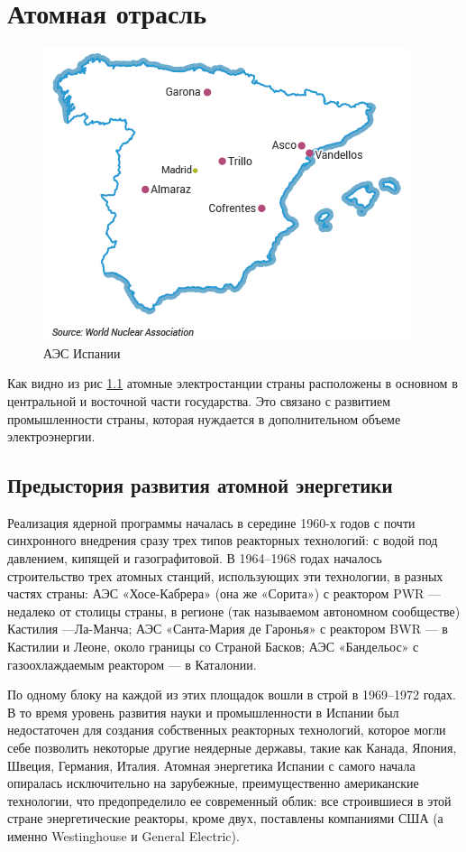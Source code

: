 \chapter{Атомная отрасль}

\begin{figure}[h]
	\begin{center}
		\includegraphics[width=.5\columnwidth]{./img/world_n_a.png}
	\end{center}
	\caption{АЭС Испании}
	\label{pic:mapOfNPP}
\end{figure}

Как видно из рис \ref{pic:mapOfNPP} атомные электростанции страны расположены в основном в центральной и восточной части государства. Это связано с развитием промышленности страны, которая нуждается в дополнительном объеме электроэнергии.

\section{Предыстория развития атомной энергетики}

Реализация ядерной программы началась в середине 1960-х годов с почти синхронного внедрения сразу трех типов реакторных технологий: с водой под давлением, кипящей и газографитовой. В 1964–1968 годах началось строительство трех атомных станций, использующих эти технологии, в разных частях страны: АЭС «Хосе-Кабрера» (она же «Сорита») с реактором PWR — недалеко от столицы страны, в регионе (так называемом автономном сообществе) Кастилия —Ла-Манча; АЭС «Санта-Мария де Гаронья» с реактором BWR — в Кастилии и Леоне, около границы со Страной Басков; АЭС «Бандельос» с газоохлаждаемым реактором — в Каталонии. 

По одному блоку на каждой из этих площадок вошли в строй в 1969–1972 годах. В то время уровень развития науки и промышленности в Испании был недостаточен для создания собственных реакторных технологий, которое могли себе позволить некоторые другие неядерные державы, такие как Канада, Япония, Швеция, Германия, Италия. Атомная энергетика Испании с самого начала опиралась исключительно на зарубежные, преимущественно американские технологии, что предопределило ее современный облик: все строившиеся в этой стране энергетические реакторы, кроме двух, поставлены компаниями США (а именно Westinghouse и General Electric).

